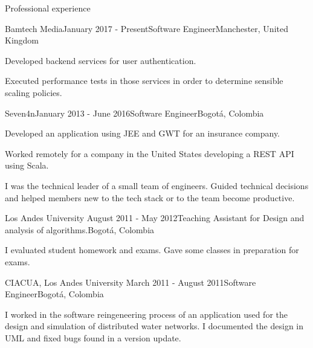 \documentclass{resume} %
\def\uniandes{Los Andes University }
\begin{document}
\begin{rSection}{Professional experience}

\begin{rSubsection}{Bamtech Media}{January 2017 - Present}{Software Engineer}{Manchester, United Kingdom}
\item Developed backend services for user authentication.
\item Executed performance tests in those services in order to determine sensible scaling policies.
\end{rSubsection}

\begin{rSubsection}{Seven4n}{January 2013 - June 2016}{Software Engineer}{Bogot\'a, Colombia}
\item Developed an application using JEE and GWT for an insurance company.
\item Worked remotely for a company in the United States developing a REST API using Scala.
\item I was the technical leader of a small team of engineers. Guided technical decisions and helped members new to the tech stack or to the team become productive.
\end{rSubsection}


\begin{rSubsection}{\uniandes}{August 2011 - May 2012}{Teaching Assistant for Design and analysis of algorithms.}{Bogot\'a, Colombia}
\item I evaluated student homework and exams. Gave some classes in preparation for exams.
\end{rSubsection}


\begin{rSubsection}{CIACUA, \uniandes}{March 2011 - August 2011}{Software Engineer}{Bogot\'a, Colombia}
\item I worked in the software reingeneering process of an application used for the design and simulation of distributed water networks. I documented the design in UML and fixed bugs found in a version update.
\end{rSubsection}

\end{rSection}
\end{document}
